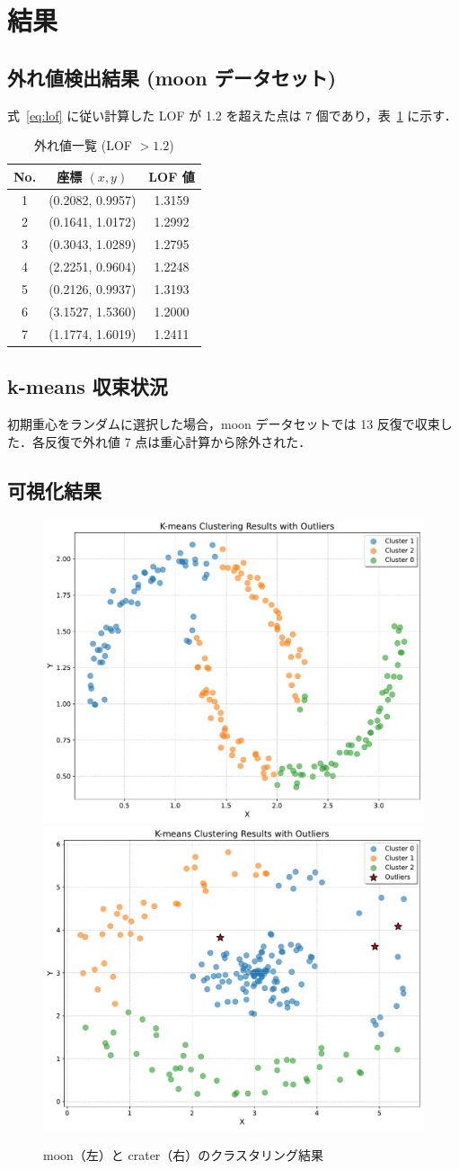 \documentclass[a4j,dvipdfmx]{jsarticle}
\begin{document}
\section{結果}
\subsection{外れ値検出結果 (moon データセット)}
式~\eqref{eq:lof} に従い計算した LOF が 1.2 を超えた点は 7 個であり，表~\ref{tab:outliers} に示す．

\begin{table}[tbp]
  \centering
  \caption{外れ値一覧 (LOF $>1.2$)}
  \label{tab:outliers}
  \begin{tabular}{ccc}
    \toprule
    No. & 座標 $(x,y)$ & LOF 値 \\
    \midrule
    1 & (0.2082, 0.9957) & 1.3159 \\
    2 & (0.1641, 1.0172) & 1.2992 \\
    3 & (0.3043, 1.0289) & 1.2795 \\
    4 & (2.2251, 0.9604) & 1.2248 \\
    5 & (0.2126, 0.9937) & 1.3193 \\
    6 & (3.1527, 1.5360) & 1.2000 \\
    7 & (1.1774, 1.6019) & 1.2411 \\
    \bottomrule
  \end{tabular}
\end{table}
\subsection{k-means 収束状況}
初期重心をランダムに選択した場合，moon データセットでは 13 反復で収束した．各反復で外れ値 7 点は重心計算から除外された．

\subsection{可視化結果}
\begin{figure}[H] %
  \centering
  \includegraphics[width=.4\textwidth]{moon_output_plot.pdf}
  \includegraphics[width=.4\textwidth]{crater_output_plot.pdf}
  \caption{moon（左）と crater（右）のクラスタリング結果}
  \label{fig:moon-crater}
\end{figure}
\end{document}
